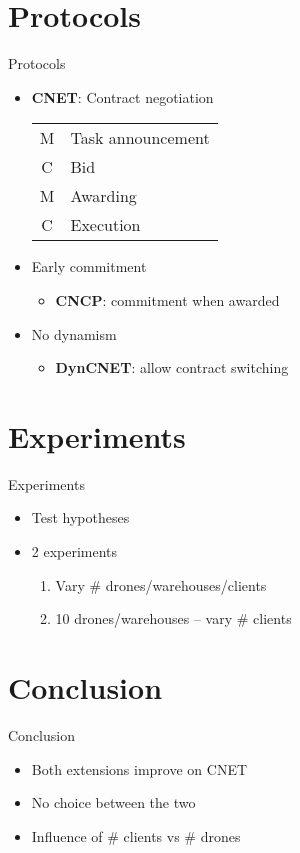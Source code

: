 \documentclass{beamer}
\begin{document}
	\section{Protocols}
		
	\begin{frame}{Protocols}
		\begin{itemize}
			\item \textbf{CNET}: Contract negotiation
			\linebreak \small	
			 \begin{tabular}{cl}
				M & Task announcement \\
				C & Bid \\
				M & Awarding \\
				C & Execution \\
			\end{tabular}
			\normalsize
			\item Early commitment
			\begin{itemize}\item \textbf{CNCP}: commitment when awarded	\end{itemize}
			\item No dynamism
			\begin{itemize}\item \textbf{DynCNET}: allow contract switching\end{itemize}
			\end{itemize}
	\end{frame}
	
	\section{Experiments}
	\begin{frame}{Experiments}
		\begin{itemize}
			\item Test hypotheses
			\item 2 experiments
			\begin{enumerate}
				\item Vary \# drones/warehouses/clients
				\item 10 drones/warehouses -- vary \# clients
			\end{enumerate}
		\end{itemize}
	\end{frame}
	
	\section{Conclusion}
	\begin{frame}{Conclusion}
		\begin{itemize}
			\item Both extensions improve on CNET
			\item No choice between the two
			\item Influence of \# clients vs \# drones
		\end{itemize}
	\end{frame}
	
\end{document}
